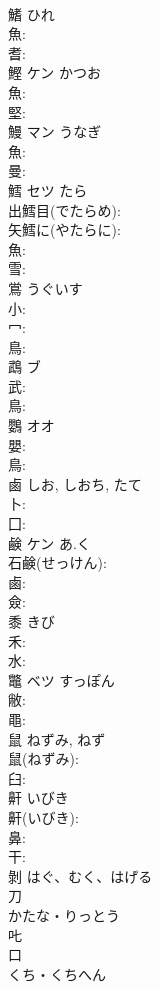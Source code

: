 \documentclass[8pt]{extreport}
\begin{document}
\begin{CJK}{UTF8}{min}
\\	鰭		ひれ			
\\	魚: 
\\	耆: 
\\	鰹	ケン	かつお		
\\	魚: 
\\	堅: 
\\	鰻	マン	うなぎ		
\\	魚: 
\\	曼: 
\\	鱈	セツ	たら		
\\	出鱈目(でたらめ): 
\\	矢鱈に(やたらに): 
\\	魚: 
\\	雪: 
\\	鴬		うぐいす			
\\	小: 
\\	冖: 
\\	鳥: 
\\	鵡	ブ			
\\	武: 
\\	鳥: 
\\	鸚	オオ			
\\	嬰: 
\\	鳥: 
\\	鹵		しお, しおち, たて			
\\	卜: 
\\	囗: 
\\	鹸	ケン	あ.く		
\\	石鹸(せっけん): 
\\	鹵: 
\\	僉: 
\\	黍		きび			
\\	禾: 
\\	水: 
\\	鼈	ベツ	すっぽん		
\\	敝: 
\\	黽: 
\\	鼠		ねずみ, ねず			
\\	鼠(ねずみ): 
\\	臼: 
\\	鼾		いびき			
\\	鼾(いびき): 
\\	鼻: 
\\	干: 
\\	剝		はぐ、むく、はげる				
\\	刀	
\\	かたな・りっとう	
\\	𠮟						
\\	口	
\\	くち・くちへん	

\end{CJK}
\end{document}
